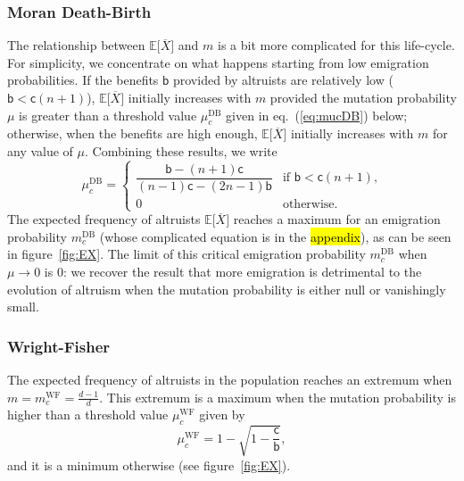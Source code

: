 \documentclass[11pt, letterpaper]{article}
\renewcommand{\eqref}[1]{\textup{{\normalfont eq.~(\ref{#1}}\normalfont)}}
\newcommand{\Esp}[1]{\mathbb{E}\big[ #1\big]}%
\newcommand{\bb}{\mathsf{b}}
\newcommand{\cc}{\mathsf{c}}
\newcommand{\DB}{\textrm{DB}}
\newcommand{\WF}{\textrm{WF}}
\begin{document}
\subsubsection{Moran Death-Birth}

The relationship between $\Esp{\overline{X}}$ and $m$ is a bit more complicated for this life-cycle. For simplicity, we concentrate on what happens starting from low emigration probabilities. If the benefits $\bb$ provided by altruists are relatively low ($\bb < \cc (n+1)$), $\Esp{\overline{X}}$ initially increases with $m$ provided the mutation probability $\mu$ is greater than a threshold value $\mu_c^{\DB}$ given in \eqref{eq:mucDB} below; otherwise, when the benefits are high enough, $\Esp{\overline{X}}$ initially increases with $m$ for any value of $\mu$. Combining these results, we write
\begin{equation}\label{eq:mucDB}
\mu_c^{\DB} = \begin{cases}
\dfrac{\bb -  (n+1) \cc}{ (n-1) \cc - (2 n - 1) \bb} & \textrm{if $\bb < \cc (n+1)$,} \\
%
0 & \textrm{otherwise. }
\end{cases}
\end{equation} 
The expected frequency of altruists $\Esp{\overline{X}}$ reaches a maximum for an emigration probability $m_c^{\DB}$ (whose complicated equation is in the \hl{appendix}), as can be seen in figure~\ref{fig:EX}. The limit of this critical emigration probability $m_c^{\DB}$ when $\mu \to 0$ is $0$: we recover the result that more emigration is detrimental to the evolution of altruism when the mutation probability is either null or vanishingly small. 

\subsubsection{Wright-Fisher}

The expected frequency of altruists in the population reaches an extremum when $m = m_c^{\WF} = \frac{d-1}{d}$. This extremum is a maximum when the mutation probability is higher than a threshold value $\mu_c^{\WF}$ given by 
\begin{equation}
\mu_c^{\WF} = 1-\sqrt{1-\frac{\cc}{\bb}},
\end{equation}
and it is a minimum otherwise (see figure~\ref{fig:EX}). 
\end{document}
